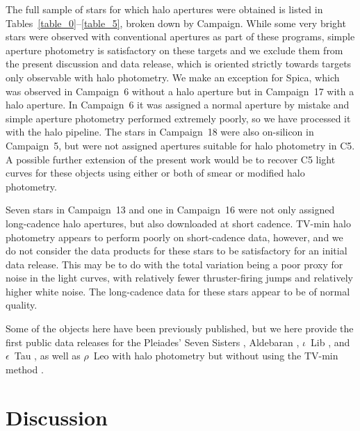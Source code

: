 \documentclass[twocolumn]{aastex62}
\begin{document}

The full sample of stars for which halo apertures were obtained is listed in Tables~\ref{table_0}--\ref{table_5}, broken down by Campaign. While some very bright stars were observed with conventional apertures as part of these programs, simple aperture photometry is satisfactory on these targets and we exclude them from the present discussion and data release, which is oriented strictly towards targets only observable with halo photometry. We make an exception for Spica, which was observed in Campaign~6 without a halo aperture but in Campaign~17 with a halo aperture. In Campaign~6 it was assigned a normal aperture by mistake and simple aperture photometry performed extremely poorly, so we have processed it with the halo pipeline. The stars in Campaign~18 were also on-silicon in Campaign~5, but were not assigned apertures suitable for halo photometry in C5. A possible further extension of the present work would be to recover C5 light curves for these objects using either or both of smear or modified halo photometry.

Seven stars in Campaign~13 and one in Campaign~16 were not only assigned long-cadence halo apertures, but also downloaded at short cadence. TV-min halo photometry appears to perform poorly on short-cadence data, however, and we do not consider the data products for these stars to be satisfactory for an initial data release. This may be to do with the total variation being a poor proxy for noise in the light curves, with relatively fewer thruster-firing jumps and relatively higher white noise. The long-cadence data for these stars appear to be of normal quality. 



Some of the objects here have been previously published, but we here provide the first public data releases for the Pleiades' Seven Sisters \citep{White2017}, Aldebaran \citep{Farr2018}, $\iota$~Lib \citep{Buysschaert2018}, and $\epsilon$~Tau \citep{Arentoft2019}, as well as $\rho$~Leo with halo photometry but without using the TV-min method \citep{Aerts2018}.

\section{Discussion}
\label{sec:discussion}
\end{document}
